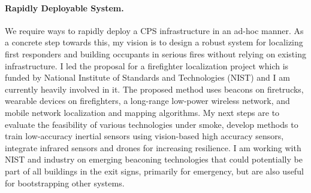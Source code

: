 \documentclass[10pt]{article}
\begin{document}
\paragraph{Rapidly Deployable System. }
We require ways to rapidly deploy a CPS infrastructure in an ad-hoc manner. 
As a concrete step towards this, my vision is to design a robust system for localizing first responders and building occupants in serious fires without relying on existing infrastructure. I led the proposal for a firefighter localization project which is funded by National Institute of Standards and Technologies (NIST) and I am currently heavily involved in it.
The proposed method uses beacons on firetrucks, wearable devices on firefighters, a long-range low-power wireless network, and mobile network localization and mapping algorithms. 
My next steps are to evaluate the feasibility of various technologies under smoke, develop methods to train low-accuracy inertial sensors using vision-based high accuracy sensors, integrate infrared sensors and drones for increasing resilience. I am working with NIST and industry on emerging beaconing technologies that could potentially be part of all buildings in the exit signs, primarily for emergency, but are also useful for bootstrapping other systems. 
 
\end{document}
